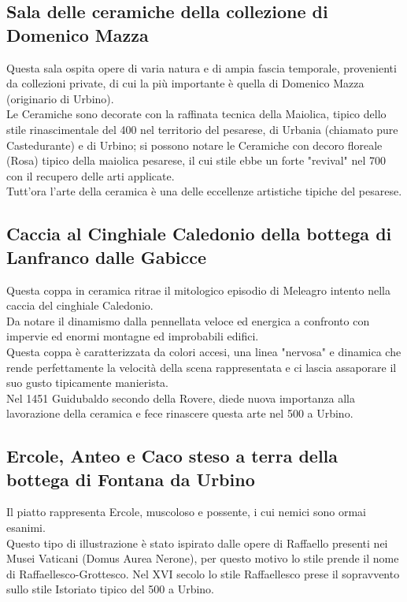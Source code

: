 \documentclass[hidelinks,12pt,a4paper]{article}
\begin{document}
\begin{flushleft}
		\section{Sala delle ceramiche della collezione di Domenico Mazza}
		Questa sala ospita opere di varia natura e di ampia fascia temporale, provenienti da collezioni private, di cui la più importante è quella di Domenico Mazza (originario di Urbino).\\ 
		Le Ceramiche sono decorate con la raffinata tecnica della Maiolica, tipico dello stile rinascimentale del 400 nel territorio del pesarese, di Urbania (chiamato pure Castedurante) e di Urbino; si possono notare le Ceramiche con decoro floreale (Rosa) tipico della maiolica pesarese, il cui stile ebbe un forte "revival" nel 700 con il recupero delle arti applicate.\\
		Tutt'ora l'arte della ceramica è una delle eccellenze artistiche tipiche del pesarese.
		
		\subsection{Caccia al Cinghiale Caledonio della bottega di Lanfranco dalle Gabicce}
		Questa coppa in ceramica ritrae il mitologico episodio di Meleagro intento nella caccia del cinghiale Caledonio.\\
		Da notare il dinamismo dalla pennellata veloce ed energica a confronto con impervie ed enormi montagne ed improbabili edifici.\\
		Questa coppa è caratterizzata da colori accesi, una linea "nervosa" e dinamica che rende perfettamente la velocità della scena rappresentata e ci lascia assaporare il suo gusto tipicamente manierista.\\
		Nel 1451 Guidubaldo secondo della Rovere, diede nuova importanza alla lavorazione della ceramica e fece rinascere questa arte nel 500 a Urbino.
		
		\subsection{Ercole, Anteo e Caco steso a terra della bottega di Fontana da Urbino}
		Il piatto rappresenta Ercole, muscoloso e possente, i cui nemici sono ormai esanimi.\\ 
		Questo tipo di illustrazione è stato ispirato dalle opere di Raffaello presenti nei Musei Vaticani (Domus Aurea Nerone), per questo motivo lo stile prende il nome di Raffaellesco-Grottesco. Nel XVI secolo lo stile Raffaellesco prese il sopravvento sullo stile Istoriato tipico del 500 a Urbino.
		

\end{flushleft}
\end{document}
